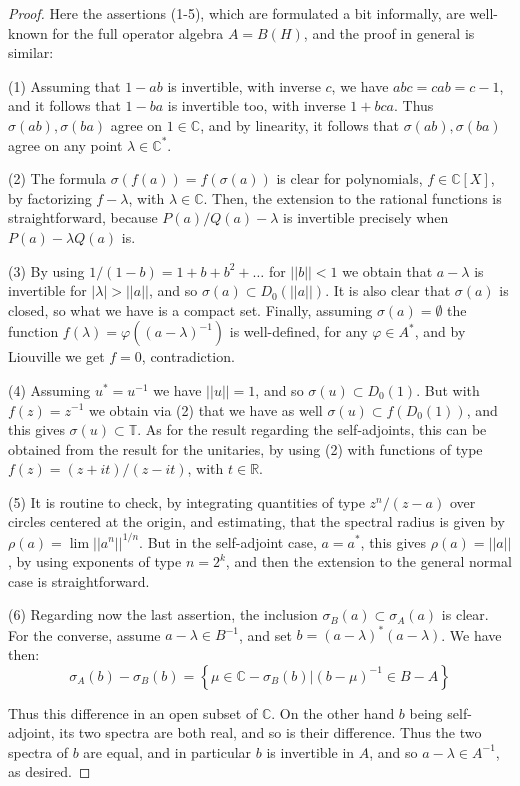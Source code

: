 \documentclass[12pt]{amsbook}
\begin{document}
\begin{proof}
Here the assertions (1-5), which are formulated a bit informally, are well-known for the full operator algebra $A=B(H)$, and the proof in general is similar:

\medskip

(1) Assuming that $1-ab$ is invertible, with inverse $c$, we have $abc=cab=c-1$, and it follows that $1-ba$ is invertible too, with inverse $1+bca$. Thus $\sigma(ab),\sigma(ba)$ agree on $1\in\mathbb C$, and by linearity, it follows that $\sigma(ab),\sigma(ba)$ agree on any point $\lambda\in\mathbb C^*$.

\medskip

(2) The formula $\sigma(f(a))=f(\sigma(a))$ is clear for polynomials, $f\in\mathbb C[X]$, by factorizing $f-\lambda$, with $\lambda\in\mathbb C$. Then, the extension to the rational functions is straightforward, because $P(a)/Q(a)-\lambda$ is invertible precisely when $P(a)-\lambda Q(a)$ is.

\medskip

(3) By using $1/(1-b)=1+b+b^2+\ldots$ for $||b||<1$ we obtain that $a-\lambda$ is invertible for $|\lambda|>||a||$, and so $\sigma(a)\subset D_0(||a||)$. It is also clear that $\sigma(a)$ is closed, so what we have is a compact set. Finally, assuming $\sigma(a)=\emptyset$ the function $f(\lambda)=\varphi((a-\lambda)^{-1})$ is well-defined, for any $\varphi\in A^*$, and by Liouville we get $f=0$, contradiction.

\medskip

(4) Assuming $u^*=u^{-1}$ we have $||u||=1$, and so $\sigma(u)\subset D_0(1)$. But with $f(z)=z^{-1}$ we obtain via (2) that we have as well $\sigma(u)\subset f(D_0(1))$, and this gives $\sigma(u)\subset\mathbb T$. As for the result regarding the self-adjoints, this can be obtained from the result for the unitaries, by using (2) with functions of type $f(z)=(z+it)/(z-it)$, with $t\in\mathbb R$.

\medskip

(5) It is routine to check, by integrating quantities of type $z^n/(z-a)$ over circles centered at the origin, and estimating, that the spectral radius is given by $\rho(a)=\lim||a^n||^{1/n}$. But in the self-adjoint case, $a=a^*$, this gives $\rho(a)=||a||$, by using exponents of type $n=2^k$, and then the extension to the general normal case is straightforward.

\medskip 

(6) Regarding now the last assertion, the inclusion $\sigma_B(a)\subset\sigma_A(a)$ is clear. For the converse, assume $a-\lambda\in B^{-1}$, and set $b=(a-\lambda )^*(a-\lambda )$. We have then:
$$\sigma_A(b)-\sigma_B(b)=\left\{\mu\in\mathbb C-\sigma_B(b)\Big|(b-\mu)^{-1}\in B-A\right\}$$

Thus this difference in an open subset of $\mathbb C$. On the other hand $b$ being self-adjoint, its two spectra are both real, and so is their difference. Thus the two spectra of $b$ are equal, and in particular $b$ is invertible in $A$, and so $a-\lambda\in A^{-1}$, as desired.
\end{proof}
\end{document}
